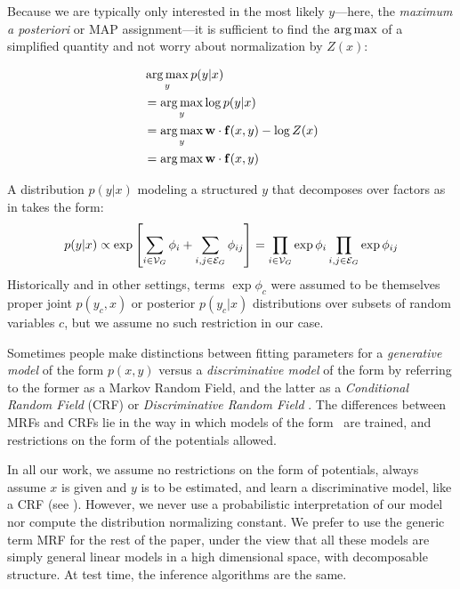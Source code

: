 Because we are typically only interested in the most likely $y$---here, the 
{\em maximum a posteriori} or MAP assignment---it is sufficient to find the 
$\mathop{\arg\max}$ of a simplified quantity and not worry about normalization by $Z(x)$:

\begin{align}
&\mathop{\arg\max}_y p(y|x) \\
&= \mathop{\arg\max}_y \log p(y|x) \\
&= \mathop{\arg\max}_y \mathbf{w} \cdot \mathbf{f}(x,y) - \log Z(x) \\
&= \mathop{\arg\max} \mathbf{w} \cdot \mathbf{f}(x,y)
\end{align}

A distribution $p(y|x)$ modeling a structured $y$ that decomposes over factors 
as in  takes the form:
\begin{equation}
p(y|x) \propto\exp\left[  \sum_{i \in \mathcal{V}_G} \phi_i + \sum_{i,j \in \mathcal{E}_G}  
\phi_{ij}\right] = \prod_{i \in \mathcal{V}_G} \exp \phi_i  \prod_{i,j \in \mathcal{E}_G} \exp 
\phi_{ij}
\label{eq:crf}
\end{equation}
Historically and in other settings, terms $\exp \phi_c$ were assumed to be 
themselves proper joint $p(y_c,x)$ or posterior $p(y_c|x)$ distributions over 
subsets of random variables $c$, but we assume no such restriction in our case.  

Sometimes people make distinctions between fitting parameters for a {\em 
generative model} of the form $p(x,y)$ versus a {\em discriminative model} of 
the form by referring to the former as a Markov Random Field, and the latter as 
a {\em Conditional Random Field} (CRF) \citep{lafferty01crfs} or {\em 
Discriminative Random Field} \citep{kumar2003discriminative}.  The differences 
between MRFs and CRFs lie in the way in which models of the form~ 
are trained, and restrictions on the form of the potentials allowed.  

In all our work, we assume no restrictions on the form of potentials, always 
assume $x$ is given and $y$ is to be estimated, and learn a discriminative 
model, like a CRF (see ).  However, we never use a 
probabilistic interpretation of our model nor compute the distribution 
normalizing constant.  We prefer to use the generic term MRF for the rest of 
the paper, under the view that all these models are simply general linear 
models in a high dimensional space, with decomposable structure.  At test time, 
the inference algorithms are the same.  

